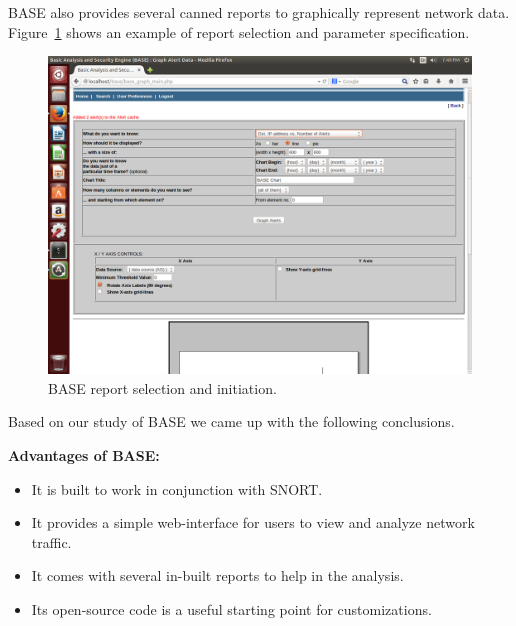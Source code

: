 BASE also provides several canned reports to graphically represent
network data. Figure~\ref{fig:r4} shows an example of report selection and
parameter specification.

\begin{figure}[!tb]
    \centering
    \includegraphics[width=1.7\columnwidth]{figures/R4_BASE_Report}
    \caption{BASE report selection and initiation.}
    \label{fig:r4}
\end{figure}

Based on our study of BASE we came up with the following conclusions.

\textbf{Advantages of BASE:}
\begin{itemize}

\item It is built to work in conjunction with SNORT.

\item It provides a simple web-interface for users to view and
  analyze network traffic.

\item It comes with several in-built reports to help in the analysis.

\item Its open-source code is a useful starting point for customizations.

\end{itemize}

